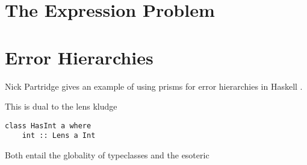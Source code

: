\documentclass{article}
\begin{document}
\section{The Expression Problem}



\section{Error Hierarchies}

Nick Partridge gives an example of using prisms for error hierarchies in Haskell \cite{errorprisms}.

This is dual to the lens kludge

\begin{verbatim}
class HasInt a where
    int :: Lens a Int
\end{verbatim}


Both entail the globality of typeclasses and the esoteric
\end{document}
